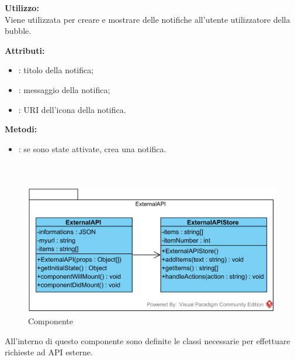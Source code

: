 \textbf{Utilizzo:}\\
Viene utilizzata per creare e mostrare delle notifiche all'utente utilizzatore della bubble.



\textbf{Attributi:}
\begin{itemize}
	\item {}: titolo della notifica;
	\item {}: messaggio della notifica;
	\item {}: URI dell'icona della notifica.
\end{itemize}

\textbf{Metodi:}
\begin{itemize}
	\item {}: se sono state attivate, crea una notifica.
\end{itemize}

\subparagraph[::ExternalAPI]{\class}\mbox{}\\ \label{\class}
\begin{figure}[H]
	\centering
	\includegraphics[width=15cm]{./diagrammi/framework/model/api/externalapi.png}
	\caption{Componente \class}
\end{figure}
All'interno di questo componente sono definite le classi necessarie per effettuare richieste ad API esterne.

\subsubparagraph[::ExternalAPI]{\class}\mbox{}\\ \label{\class}

